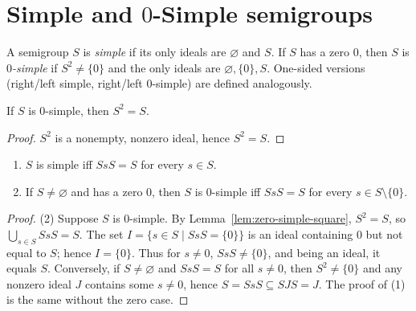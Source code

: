 
\section {Simple and \(0\)-Simple semigroups}

\begin{definition}
\label{def:simple-zero-simple}
A semigroup \(S\) is \emph{simple} if its only ideals are \(\varnothing\) and \(S\). If \(S\) has a zero \(0\), then \(S\) is \emph{\(0\)-simple} if \(S^2\ne \{0\}\) and the only ideals are \(\varnothing,\{0\},S\). One-sided versions (right/left simple, right/left \(0\)-simple) are defined analogously.
\end{definition}

\begin{lemma}
\label{lem:zero-simple-square}
If \(S\) is \(0\)-simple, then \(S^2=S\).
\end{lemma}
\begin{proof}
\(S^2\) is a nonempty, nonzero ideal, hence \(S^2=S\).
\end{proof}

\begin{lemma}
\label{lem:simple-characterization}
\leavevmode
\begin{enumerate}
  \item \(S\) is simple iff \(S s S=S\) for every \(s\in S\).
  \item If \(S\ne\varnothing\) and has a zero \(0\), then \(S\) is \(0\)-simple iff \(S s S=S\) for every \(s\in S\setminus\{0\}\).
\end{enumerate}
\end{lemma}
\begin{proof}
(2) Suppose \(S\) is \(0\)-simple. By Lemma~\ref{lem:zero-simple-square}, \(S^2=S\), so \(\bigcup_{s\in S} SsS=S\). The set \(I=\{s\in S\mid SsS=\{0\}\}\) is an ideal containing \(0\) but not equal to \(S\); hence \(I=\{0\}\). Thus for \(s\ne 0\), \(SsS\ne \{0\}\), and being an ideal, it equals \(S\). Conversely, if \(S\ne\varnothing\) and \(SsS=S\) for all \(s\ne 0\), then \(S^2\ne \{0\}\) and any nonzero ideal \(J\) contains some \(s\ne 0\), hence \(S=SsS\subseteq SJS=J\). The proof of (1) is the same without the zero case.
\end{proof}
